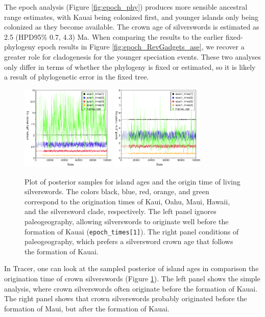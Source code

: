 The epoch analysis (Figure \ref{fig:epoch_phy}) produces more sensible ancestral range estimates, with Kauai being colonized first, and younger islands only being colonized as they become available.
The crown age of silverswords is estimated as 2.5 (HPD95\% 0.7, 4.3) Ma.
When comparing the results to the earlier fixed-phylogeny epoch results in Figure \ref{fig:epoch_RevGadgets_ase}, we recover a greater role for cladogenesis for the younger speciation events.
These two analyses only differ in terms of whether the phylogeny is fixed or estimated, so it is likely a result of phylogenetic error in the fixed tree.


\begin{figure}[!h]
\centering
\includegraphics[width=0.4\textwidth]{figures/fig_simple_ages.pdf} \includegraphics[width=0.4\textwidth]{figures/fig_epoch_ages.pdf} 

\caption{Plot of posterior samples for island ages and the origin time of living silverswords.
The colors black, blue, red, orange, and green correspond to the origination times of Kaui, Oahu, Maui, Hawaii, and the silversword clade, respectively.
The left panel ignores paleogeography, allowing silverswords to originate well before the formation of Kauai ({\tt epoch\_times[1]}).
The right panel conditions of paleogeography, which prefers a silversword crown age that follows the formation of Kauai.}
\label{fig:epoch_ages}
\end{figure}


In Tracer, one can look at the sampled posterior of island ages in comparison the origination time of crown silverswords (Figure \ref{fig:epoch_ages}).
The left panel shows the simple analysis, where crown silverswords often originate before the formation of Kauai.
The right panel shows that crown silverswords probably originated before the formation of Maui, but after the formation of Kauai.

